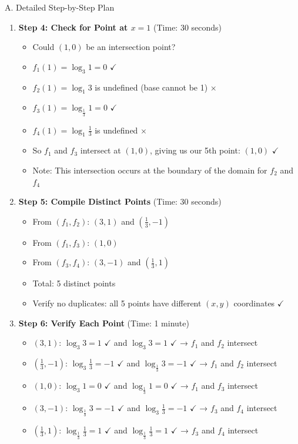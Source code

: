 \documentclass[12pt]{article}
\begin{document}
\begin{roadmapbox}{A. Detailed Step-by-Step Plan}
\begin{enumerate}[leftmargin=*]
    \item \textbf{Step 4: Check for Point at $x = 1$} (Time: 30 seconds)
    \begin{itemize}
        \item Could $(1, 0)$ be an intersection point?
        \item $f_1(1) = \log_3 1 = 0$ $\checkmark$
        \item $f_2(1) = \log_1 3$ is undefined (base cannot be 1) $\times$
        \item $f_3(1) = \log_{\frac{1}{3}} 1 = 0$ $\checkmark$
        \item $f_4(1) = \log_1 \frac{1}{3}$ is undefined $\times$
        \item So $f_1$ and $f_3$ intersect at $(1, 0)$, giving us our 5th point: $(1, 0)$ $\checkmark$
        \item Note: This intersection occurs at the boundary of the domain for $f_2$ and $f_4$
    \end{itemize}
    
    \item \textbf{Step 5: Compile Distinct Points} (Time: 30 seconds)
    \begin{itemize}
        \item From $(f_1, f_2)$: $(3, 1)$ and $(\frac{1}{3}, -1)$
        \item From $(f_1, f_3)$: $(1, 0)$
        \item From $(f_3, f_4)$: $(3, -1)$ and $(\frac{1}{3}, 1)$
        \item Total: 5 distinct points
        \item Verify no duplicates: all 5 points have different $(x, y)$ coordinates $\checkmark$
    \end{itemize}
    
    \item \textbf{Step 6: Verify Each Point} (Time: 1 minute)
    \begin{itemize}
        \item $(3, 1)$: $\log_3 3 = 1$ $\checkmark$ and $\log_3 3 = 1$ $\checkmark$ → $f_1$ and $f_2$ intersect
        \item $(\frac{1}{3}, -1)$: $\log_3 \frac{1}{3} = -1$ $\checkmark$ and $\log_{\frac{1}{3}} 3 = -1$ $\checkmark$ → $f_1$ and $f_2$ intersect
        \item $(1, 0)$: $\log_3 1 = 0$ $\checkmark$ and $\log_{\frac{1}{3}} 1 = 0$ $\checkmark$ → $f_1$ and $f_3$ intersect
        \item $(3, -1)$: $\log_{\frac{1}{3}} 3 = -1$ $\checkmark$ and $\log_3 \frac{1}{3} = -1$ $\checkmark$ → $f_3$ and $f_4$ intersect
        \item $(\frac{1}{3}, 1)$: $\log_{\frac{1}{3}} \frac{1}{3} = 1$ $\checkmark$ and $\log_{\frac{1}{3}} \frac{1}{3} = 1$ $\checkmark$ → $f_3$ and $f_4$ intersect
    \end{itemize}
\end{enumerate}


\end{roadmapbox}
\end{document}
